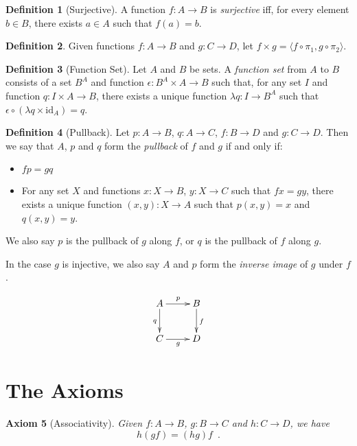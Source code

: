 \documentclass{book}
\newtheorem{ax}{Axiom}[chapter]
\theoremstyle{definition}
\newtheorem{df}[ax]{Definition}
\newcommand{\id}[1]{\ensuremath{\mathrm{id}_{#1}}}
\begin{document}
\begin{df}[Surjective]
A function $f : A \rightarrow B$ is \emph{surjective} iff, for every element $b \in B$, there exists $a \in A$ such that $f(a) = b$.
\end{df}

\begin{df}
Given functions $f : A \rightarrow B$ and $g : C \rightarrow D$, let $f \times g = \langle f \circ \pi_1, g \circ \pi_2 \rangle$.
\end{df}

\begin{df}[Function Set]
Let $A$ and $B$ be sets. A \emph{function set} from $A$ to $B$ consists of a set $B^A$ and function $\epsilon : B^A \times A \rightarrow B$ such that, for any set $I$ and function $q : I \times A \rightarrow B$, there exists a unique function $\lambda q : I \rightarrow B^A$ such that $\epsilon \circ (\lambda q \times \id{A}) = q$.
\end{df}

\begin{df}[Pullback]
Let $p : A \rightarrow B$, $q : A \rightarrow C$, $f : B \rightarrow D$ and $g : C \rightarrow D$. Then we say that $A$, $p$ and $q$ form the \emph{pullback} of $f$ and $g$ if and only if:
\begin{itemize}
\item $fp = gq$
\item For any set $X$ and functions $x : X \rightarrow B$, $y : X \rightarrow C$ such that $fx = gy$, there exists a unique function $(x,y) : X \rightarrow A$ such that $p (x,y) = x$ and $q(x,y) = y$.
\end{itemize}
We also say $p$ is the pullback of $g$ along $f$, or $q$ is the pullback of $f$ along $g$.

In the case $g$ is injective, we also say $A$ and $p$ form the \emph{inverse image} of $g$ under $f$.
\end{df}

\[ \xymatrix{
A \ar[r]^p \ar[d]_q & B \ar[d]^f \\
C \ar[r]_g & D
} \]

\section{The Axioms}

\begin{ax}[Associativity]
Given $f : A \rightarrow B$, $g : B \rightarrow C$ and $h : C \rightarrow D$, we have
\[ h (gf) = (hg) f \enspace . \]
\end{ax}
\end{document}
